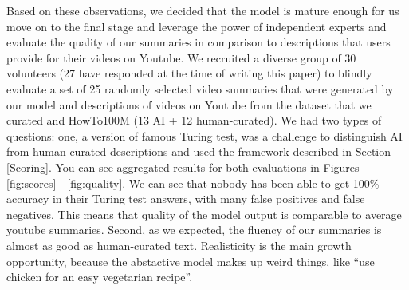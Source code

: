 \documentclass{article}
\begin{document}
Based on these observations, we decided that the model is mature enough for us move on to the final stage and leverage the power of independent experts and evaluate the quality of our summaries in comparison to descriptions that users provide for their videos on Youtube. We recruited a diverse group of 30 volunteers (27 have responded at the time of writing this paper) to blindly evaluate a set of 25 randomly selected video summaries  that were generated by our model and descriptions of videos on Youtube  from the dataset that we curated and HowTo100M (13 AI + 12 human-curated). We had two types of questions: one, a version of famous Turing test, was a challenge to distinguish AI from human-curated descriptions and used the framework described in Section \ref{Scoring}. You can see aggregated results for both evaluations in Figures \ref{fig:scores} - \ref{fig:quality}. We can see that nobody has been able to get 100\% accuracy in their Turing test answers, with many false positives and false negatives. This means that quality of the model output is comparable to average youtube summaries. Second, as we expected, the fluency of our summaries is almost as good as  human-curated text. Realisticity is the main growth opportunity, because the abstactive model makes up weird things, like “use chicken for an easy vegetarian recipe”.
\end{document}
